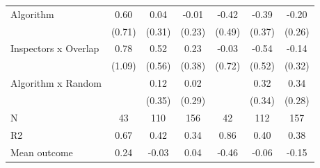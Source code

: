 \begin{tabular}{lccc|ccc}
Algorithm   &        0.60         &        0.04         &       -0.01         &       -0.42         &       -0.39         &       -0.20         \\
            &      (0.71)         &      (0.31)         &      (0.23)         &      (0.49)         &      (0.37)         &      (0.26)         \\
\addlinespace
Inspectors x Overlap&        0.78         &        0.52         &        0.23         &       -0.03         &       -0.54         &       -0.14         \\
            &      (1.09)         &      (0.56)         &      (0.38)         &      (0.72)         &      (0.52)         &      (0.32)         \\
\addlinespace
Algorithm x Random&                     &        0.12         &        0.02         &                     &        0.32         &        0.34         \\
            &                     &      (0.35)         &      (0.29)         &                     &      (0.34)         &      (0.28)         \\
\midrule
N           &          43         &         110         &         156         &          42         &         112         &         157         \\
R2          &        0.67         &        0.42         &        0.34         &        0.86         &        0.40         &        0.38         \\
Mean outcome&        0.24         &       -0.03         &        0.04         &       -0.46         &       -0.06         &       -0.15         \\
\bottomrule \end{tabular}
